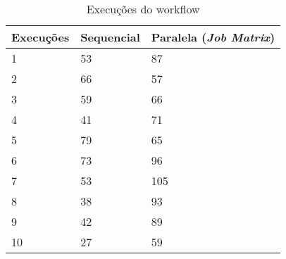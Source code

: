 \begin{table}[ht!]
\centering
\begin{tabular}{|l|l|l|}
\hline
\textbf{Execuções} & \textbf{Sequencial} & \textbf{Paralela} (\textit{Job Matrix}) \\ \hline
1         & 53         & 87                    \\ \hline
2         & 66         & 57                    \\ \hline
3         & 59         & 66                    \\ \hline
4         & 41         & 71                    \\ \hline
5         & 79         & 65                    \\ \hline
6         & 73         & 96                    \\ \hline
7         & 53         & 105                   \\ \hline
8         & 38         & 93                    \\ \hline
9         & 42         & 89                    \\ \hline
10        & 27         & 59                    \\ \hline
\end{tabular}
\caption{Execuções do workflow}
\label{tab:device-tests-full}
\end{table}